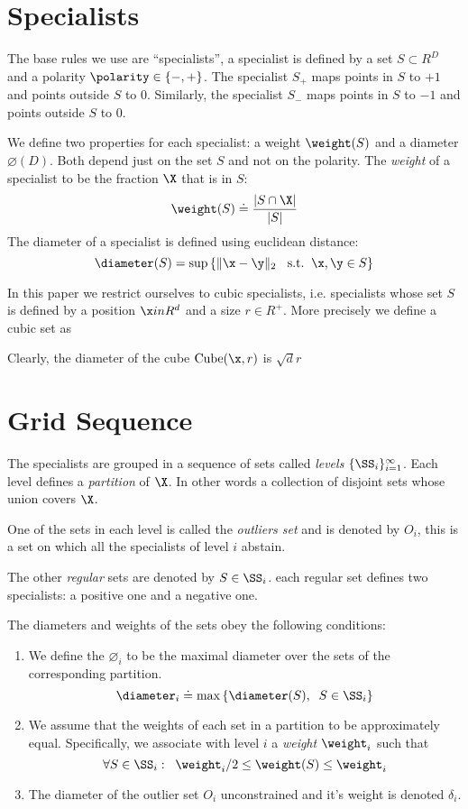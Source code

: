 \section{Specialists}

The base rules we use are ``specialists'', a specialist is defined by
a set $S \subset R^D$ and a polarity $\polarity \in \{-,+\}$. The
specialist $S_+$ maps points in $S$ to $+1$ and points outside $S$ to
$0$. Similarly, the specialist $S_-$ maps points in $S$ to $-1$ and
points outside $S$ to $0$.

We define two properties for each specialist: a weight $\weight(S)$
and a diameter $\diameter(D)$. Both depend just on the set $S$ and not
on the polarity. The {\em weight} of a specialist to be the fraction $\X$
that is in $S$:
\[
\weight(S) \doteq \frac{|S \cap \X|}{|S|}
\]
The diameter of a specialist is defined using euclidean distance:
\[
\diameter(S) = \text{sup} \left\{ \|\x-\y \|_2 \;\;\text{ s.t.}\;\;   \x,\y
\in S \right\}
\]

In this paper we restrict ourselves to cubic specialists,
i.e. specialists whose set $S$ is defined by a position $\x in R^d$
and a size $r \in R^+$. More precisely we define a cubic set as

Clearly, the diameter of the cube $\text{Cube}(\x,r)$ is $\sqrt{d} r$

\section{Grid Sequence}

The specialists are grouped in a sequence of sets called {\em levels}
$\{\SS_i\}_{i=1}^\infty$.  Each level defines a {\em partition} of
$\X$. In other words a collection of disjoint sets whose union covers
$\X$.

One of the sets in each level is called the {\em outliers set} and is
denoted by $O_i$, this is a set on which all the specialists of level
$i$ abstain.

The other {\em regular} sets are denoted by $S \in \SS_i$.
each regular set defines two specialists: a positive one and a negative one.

The diameters and weights of the sets obey the following conditions:
\begin{enumerate}
\item We define the $\diameter_i$ to be the maximal diameter over the
  sets of the corresponding partition. $$\diameter_i \doteq \max
  \left\{ \diameter(S),\;\;S \in \SS_i \right\} $$
\item We assume that the weights of each set in a partition to be
  approximately equal. Specifically, we associate with level $i$ a
  {\em weight} $\weight_i$ such that $$ \forall S \in \SS_i:\;\;
  \weight_i/2 \leq \weight(S) \leq \weight_i $$
\item The diameter of the outlier set $O_i$ unconstrained and it's
  weight is denoted $\delta_i$.
\end{enumerate}

